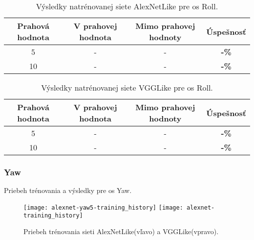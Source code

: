 \begin{table}[H]
    \centering
    \begin{tabular}{|c|c|c|c|}
        \hline
        Prahová hodnota & V prahovej hodnota       & Mimo prahovej hodnoty    & Úspešnosť    \\ \hline
        5               & {\color[HTML]{009901} -} & {\color[HTML]{9A0000} -} & \textbf{-\%} \\ \hline
        10              & {\color[HTML]{009901} -} & {\color[HTML]{9A0000} -} & \textbf{-\%} \\ \hline
    \end{tabular}
    \caption{Výsledky natrénovanej siete AlexNetLike pre os Roll.}
    \label{tab:alexnetrollresults}
\end{table}
\begin{table}[H]
    \centering
    \begin{tabular}{|c|c|c|c|}
        \hline
        Prahová hodnota & V prahovej hodnota       & Mimo prahovej hodnoty    & Úspešnosť    \\ \hline
        5               & {\color[HTML]{009901} -} & {\color[HTML]{9A0000} -} & \textbf{-\%} \\ \hline
        10              & {\color[HTML]{009901} -} & {\color[HTML]{9A0000} -} & \textbf{-\%} \\ \hline
    \end{tabular}
    \caption{Výsledky natrénovanej siete VGGLike pre os Roll.}
    \label{tab:vgglikerollresults}
\end{table}


\subsubsection{Yaw}
Priebeh trénovania a výsledky pre os Yaw.

\begin{figure}[H]
    \centering
    \texttt{[image: alexnet-yaw5-training\_history]}
	\texttt{[image: alexnet-training\_history]} %
	\caption{Priebeh trénovania sieti AlexNetLike(vľavo) a VGGLike(vpravo).}
	\label{pic:yawaxis}
\end{figure}

